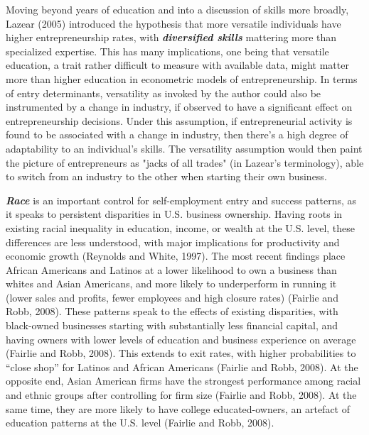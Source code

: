 Moving beyond years of education and into a discussion of skills more broadly, Lazear (2005) introduced the hypothesis that more versatile individuals have higher entrepreneurship rates, with \textbf{\textit{diversified skills}} mattering more than specialized expertise. This has many implications, one being that versatile education, a trait rather difficult to measure with available data, might matter more than higher education in econometric models of entrepreneurship. In terms of entry determinants, versatility as invoked by the author could also be instrumented by a change in industry, if observed to have a significant effect on entrepreneurship decisions. Under this assumption, if entrepreneurial activity is found to be associated with a change in industry, then there’s a high degree of adaptability to an individual’s skills. The versatility assumption would then paint the picture of entrepreneurs as "jacks of all trades" (in Lazear's terminology), able to switch from an industry to the other when starting their own business.

\textbf{\textit{Race}} is an important control for self-employment entry and success patterns, as it speaks to persistent disparities in U.S. business ownership. Having roots in existing racial inequality in education, income, or wealth at the U.S. level, these differences are less understood, with major implications for productivity and economic growth (Reynolds and White, 1997). The most recent findings place African Americans and Latinos at a lower likelihood to own a business than whites and Asian Americans, and more likely to underperform in running it (lower sales and profits, fewer employees and high closure rates) (Fairlie and Robb, 2008). These patterns speak to the effects of existing disparities, with black-owned businesses starting with substantially less financial capital, and having owners with lower levels of education and business experience on average (Fairlie and Robb, 2008). This extends to exit rates, with higher probabilities to “close shop” for Latinos and African Americans (Fairlie and Robb, 2008). At the opposite end, Asian American firms have the strongest performance among racial and ethnic groups after controlling for firm size (Fairlie and Robb, 2008). At the same time, they are more likely to have college educated-owners, an artefact of education patterns at the U.S. level (Fairlie and Robb, 2008).

